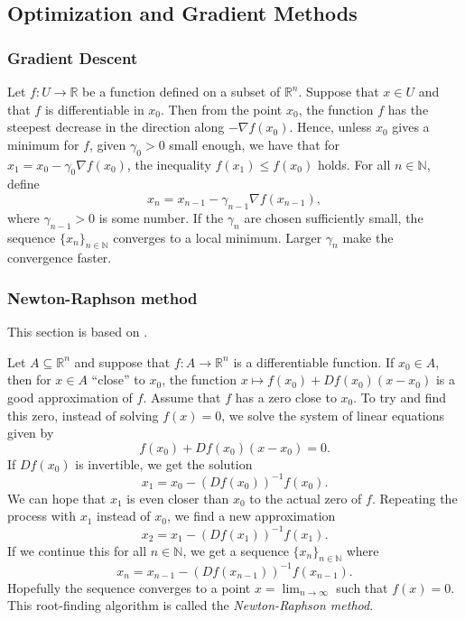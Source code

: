 \subsection{Optimization and Gradient Methods}\label{sec:optim theory}

\subsubsection{Gradient Descent}\label{sec:gradient descent}
Let $f\colon U\to\mathbb{R}$ be a function defined on a subset of $\mathbb{R}^n$. Suppose that $x\in U$ and that $f$ is differentiable in $x_0$. Then from the point $x_0$, the function $f$ has the steepest decrease in the direction along $-\nabla f(x_0)$. Hence, unless $x_0$ gives a minimum for $f$, given $\gamma_0 > 0$ small enough, we have that for $x_1 = x_0 - \gamma_0\nabla f(x_0)$, the inequality $f(x_1)\le f(x_0)$ holds. For all $n\in\mathbb{N}$, define
\begin{equation*}
    x_n = x_{n-1} - \gamma_{n-1}\nabla f(x_{n-1}),
\end{equation*}
where $\gamma_{n-1}>0$ is some number. If the $\gamma_{n}$ are chosen sufficiently small, the sequence $\{x_n\}_{n\in\mathbb{N}}$ converges to a local minimum. Larger $\gamma_{n}$ make the convergence faster.

\subsubsection{Newton-Raphson method}\label{sec:newton-raphson method}

This section is based on \cite[Section 5.6]{FVA}.

Let $A\subseteq\mathbb{R}^n$ and suppose that $f\colon A \to\mathbb{R}^n$ is a differentiable function. If $x_0\in A$, then for $x\in A$ “close” to $x_0$, the function $x\mapsto f(x_0)+Df(x_0)(x-x_0)$ is a good approximation of $f$. Assume that $f$ has a zero close to $x_0$. To try and find this zero, instead of solving $f(x)=0$, we solve the system of linear equations given by
\begin{equation*}
  f(x_0)+Df(x_0)(x-x_0) = 0.
\end{equation*}
If $Df(x_0)$ is invertible, we get the solution
\begin{equation*}
  x_1=x_0-(Df(x_0))^{-1}f(x_0).
\end{equation*}
We can hope that $x_1$ is even closer than $x_0$ to the actual zero of $f$. Repeating the process with $x_1$ instead of $x_0$, we find a new approximation
\begin{equation*}
  x_2=x_1-(Df(x_1))^{-1}f(x_1).
\end{equation*}
If we continue this for all $n\in\mathbb{N}$, we get a sequence $\{x_n\}_{n\in\mathbb{N}}$ where
\begin{equation*}
  x_n=x_{n-1}-(Df(x_{n-1}))^{-1}f(x_{n-1}).
\end{equation*}
Hopefully the sequence converges to a point $x=\lim_{n\to\infty}$ such that $f(x)=0$. This root-finding algorithm is called the \emph{Newton-Raphson method}.

